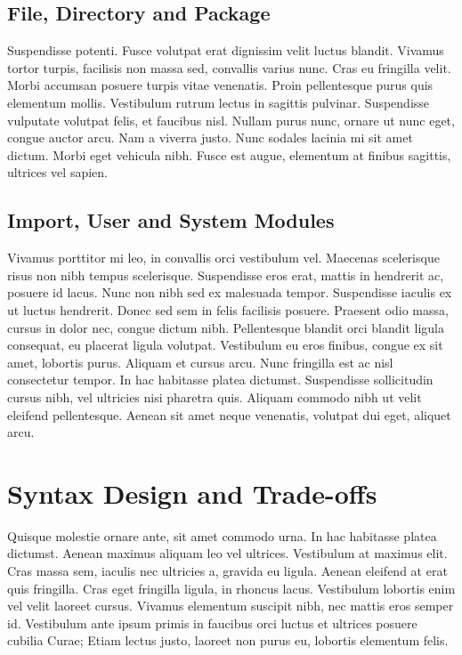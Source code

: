 \subsection{File, Directory and Package}
Suspendisse potenti. Fusce volutpat erat dignissim velit luctus blandit. Vivamus tortor turpis, facilisis non massa sed, convallis varius nunc. Cras eu fringilla velit. Morbi accumsan posuere turpis vitae venenatis. Proin pellentesque purus quis elementum mollis. Vestibulum rutrum lectus in sagittis pulvinar. Suspendisse vulputate volutpat felis, et faucibus nisl. Nullam purus nunc, ornare ut nunc eget, congue auctor arcu. Nam a viverra justo. Nunc sodales lacinia mi sit amet dictum. Morbi eget vehicula nibh. Fusce est augue, elementum at finibus sagittis, ultrices vel sapien.

\subsection{Import, User and System Modules}
Vivamus porttitor mi leo, in convallis orci vestibulum vel. Maecenas scelerisque risus non nibh tempus scelerisque. Suspendisse eros erat, mattis in hendrerit ac, posuere id lacus. Nunc non nibh sed ex malesuada tempor. Suspendisse iaculis ex ut luctus hendrerit. Donec sed sem in felis facilisis posuere. Praesent odio massa, cursus in dolor nec, congue dictum nibh. Pellentesque blandit orci blandit ligula consequat, eu placerat ligula volutpat. Vestibulum eu eros finibus, congue ex sit amet, lobortis purus. Aliquam et cursus arcu. Nunc fringilla est ac nisl consectetur tempor. In hac habitasse platea dictumst. Suspendisse sollicitudin cursus nibh, vel ultricies nisi pharetra quis. Aliquam commodo nibh ut velit eleifend pellentesque. Aenean sit amet neque venenatis, volutpat dui eget, aliquet arcu.


\section{Syntax Design and Trade-offs}
Quisque molestie ornare ante, sit amet commodo urna. In hac habitasse platea dictumst. Aenean maximus aliquam leo vel ultrices. Vestibulum at maximus elit. Cras massa sem, iaculis nec ultricies a, gravida eu ligula. Aenean eleifend at erat quis fringilla. Cras eget fringilla ligula, in rhoncus lacus. Vestibulum lobortis enim vel velit laoreet cursus. Vivamus elementum suscipit nibh, nec mattis eros semper id. Vestibulum ante ipsum primis in faucibus orci luctus et ultrices posuere cubilia Curae; Etiam lectus justo, laoreet non purus eu, lobortis elementum felis.

